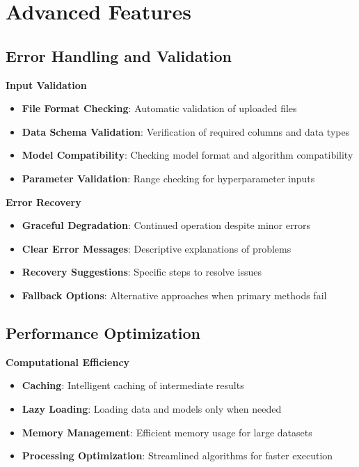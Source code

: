 \section{Advanced Features}

\subsection{Error Handling and Validation}

\textbf{Input Validation}
\begin{itemize}
	\item \textbf{File Format Checking}: Automatic validation of uploaded files
	\item \textbf{Data Schema Validation}: Verification of required columns and data types
	\item \textbf{Model Compatibility}: Checking model format and algorithm compatibility
	\item \textbf{Parameter Validation}: Range checking for hyperparameter inputs
\end{itemize}

\textbf{Error Recovery}
\begin{itemize}
	\item \textbf{Graceful Degradation}: Continued operation despite minor errors
	\item \textbf{Clear Error Messages}: Descriptive explanations of problems
	\item \textbf{Recovery Suggestions}: Specific steps to resolve issues
	\item \textbf{Fallback Options}: Alternative approaches when primary methods fail
\end{itemize}

\subsection{Performance Optimization}

\textbf{Computational Efficiency}
\begin{itemize}
	\item \textbf{Caching}: Intelligent caching of intermediate results
	\item \textbf{Lazy Loading}: Loading data and models only when needed
	\item \textbf{Memory Management}: Efficient memory usage for large datasets
	\item \textbf{Processing Optimization}: Streamlined algorithms for faster execution
\end{itemize}

